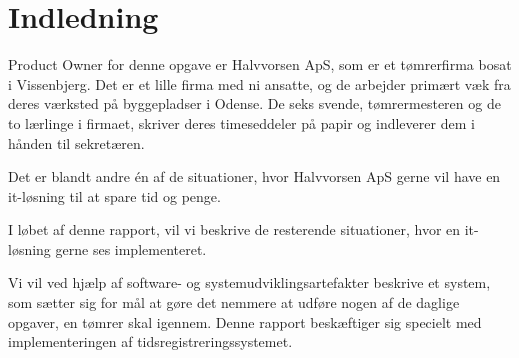 \section{Indledning}
Product Owner for denne opgave er Halvvorsen ApS, som er et tømrerfirma bosat i Vissenbjerg.
Det er et lille firma med ni ansatte, og de arbejder primært væk fra deres værksted på byggepladser i Odense.
De seks svende, tømrermesteren og de to lærlinge i firmaet, skriver deres timeseddeler på papir og indleverer dem i hånden til sekretæren. 

Det er blandt andre én af de situationer, hvor Halvvorsen ApS gerne vil have en it-løsning til at spare tid og penge.

I løbet af denne rapport, vil vi beskrive de resterende situationer, hvor en it-løsning gerne ses implementeret.

Vi vil ved hjælp af software- og systemudviklingsartefakter beskrive et system, som sætter sig for mål at gøre det nemmere at udføre nogen af de daglige opgaver, en tømrer skal igennem.
Denne rapport beskæftiger sig specielt med implementeringen af tidsregistreringssystemet.